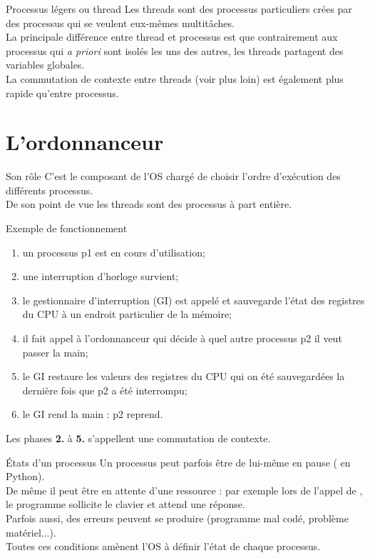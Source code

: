 \documentclass[10pt]{beamer}
\begin{document}
\begin{frame}{Processus légers ou thread}
Les \alert{threads} sont des processus particuliers crées par des processus qui se veulent eux-mêmes multitâches.\\
La principale différence entre thread et processus est que contrairement aux processus qui \textit{a priori} sont isolés les uns des autres, les threads \alert{partagent des variables globales}.\\
La commutation de contexte entre threads (voir plus loin) est également plus rapide qu'entre processus.\\

\end{frame}

\section{L'ordonnanceur}

\begin{frame}{Son rôle}
C'est le composant de l'OS chargé de \alert{choisir l'ordre d'exécution} des différents processus.\\
De son point de vue les threads sont des processus à part entière.
\end{frame}
\begin{frame}{Exemple de fonctionnement}
\begin{enumerate}[\bfseries 1.]
	\item un processus p1 est en cours d'utilisation;
    \item une interruption d'horloge survient;
    \item le \alert{gestionnaire d'interruption} (GI) est appelé et sauvegarde l'état des registres du CPU à un endroit particulier de la mémoire;
    \item il fait appel à l'\alert{ordonnanceur} qui \alert{décide} à quel autre processus p2  il veut passer la main;
    \item le GI restaure les valeurs des registres du CPU qui on été sauvegardées la dernière fois que p2 a été interrompu;
    \item le GI rend la main : p2 reprend.
\end{enumerate}
Les phases \textbf{2.} à \textbf{5.} s'appellent une \alert{commutation de contexte}.
\end{frame}
\begin{frame}{\'Etats d'un processus}
Un processus peut parfois être de lui-même en pause ( en Python).\\
De même il peut être en attente d'une ressource : par exemple lors de l'appel de , le programme sollicite le clavier et attend une réponse.\\
Parfois aussi, des erreurs peuvent se produire (programme mal codé, problème matériel...).\\

Toutes ces conditions amènent l'OS à définir l'\alert{état} de chaque processus.
\end{frame}
\end{document}
